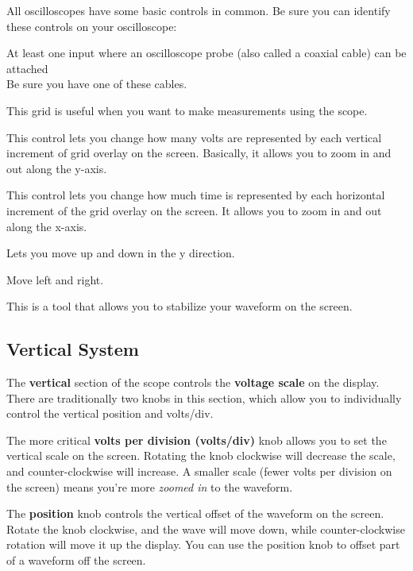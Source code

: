\documentclass[12pt, logo=tehranDLDL/ut]{tehranDLDL}
\begin{document}
All oscilloscopes have some basic controls in common.
Be sure you can identify these controls on your oscilloscope:
\begin{description}[font=\labelitemi\ \bfseries]
    \item[Probe input] At least one input where an oscilloscope probe (also called a coaxial cable) can be attached\\
    Be sure you have one of these cables.
    \item[Screen with a grid overlay]
    This grid is useful when you want to make measurements using the scope.
    \item[Volts/div]
    This control lets you change how many volts are represented by each vertical increment of grid overlay on the screen. Basically, it allows you to zoom in and out along the y-axis.
    \item[Time/div]
    This control lets you change how much time is represented by each horizontal increment of the grid overlay on the screen. It allows you to zoom in and out along the x-axis.
    \item[Vertical position/offset]
    Lets you move up and down in the y direction.
    \item[Horizontal position/offset]
    Move left and right.
    \item[Trigger level]
    This is a tool that allows you to stabilize your waveform on the screen.
\end{description}

\subsection{Vertical System}

The \textbf{vertical} section of the scope controls the \textbf{voltage scale} on the display. There are traditionally two knobs in this section, which allow you to individually control the vertical position and volts/div.

The more critical \textbf{volts per division (volts/div)} knob allows you to set the vertical scale on the screen. Rotating the knob clockwise will decrease the scale, and counter-clockwise will increase. A smaller scale (fewer volts per division on the screen) means you're more \textit{zoomed in} to the waveform.

The \textbf{position} knob controls the vertical offset of the waveform on the screen. Rotate the knob clockwise, and the wave will move down, while counter-clockwise rotation will move it up the display. You can use the position knob to offset part of a waveform off the screen.
\end{document}
